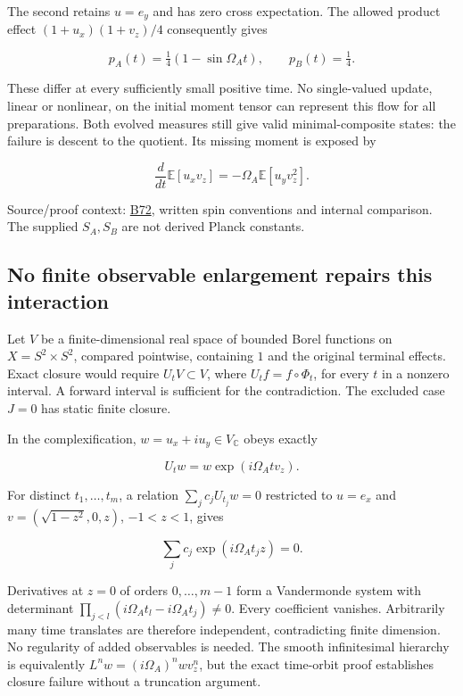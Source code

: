 \documentclass[11pt,a4paper]{article}
\begin{document}
The second retains \(u=e_y\) and has zero cross expectation. The allowed
product effect \((1+u_x)(1+v_z)/4\) consequently gives

\[p_A(t)=\tfrac14(1-\sin\Omega_At),\qquad p_B(t)=\tfrac14.\]

These differ at every sufficiently small positive time. No single-valued
update, linear or nonlinear, on the initial moment tensor can represent
this flow for all preparations. Both evolved measures still give valid
minimal-composite states: the failure is descent to the quotient. Its
missing moment is exposed by

\[\frac d{dt}\mathbb E[u_xv_z]=-\Omega_A\mathbb E[u_yv_z^2].\]

Source/proof context: \href{../references/batches/B72.md}{B72}, written
spin conventions and internal comparison. The supplied \(S_A,S_B\) are
not derived Planck constants.

\hypertarget{no-finite-observable-enlargement-repairs-this-interaction}{%
\subsection{No finite observable enlargement repairs this
interaction}\label{no-finite-observable-enlargement-repairs-this-interaction}}

Let \(V\) be a finite-dimensional real space of bounded Borel functions
on \(X=S^2\times S^2\), compared pointwise, containing \(1\) and the
original terminal effects. Exact closure would require
\(U_tV\subset V\), where \(U_tf=f\circ\Phi_t\), for every \(t\) in a
nonzero interval. A forward interval is sufficient for the
contradiction. The excluded case \(J=0\) has static finite closure.

In the complexification, \(w=u_x+iu_y\in V_{\mathbb C}\) obeys exactly

\[U_tw=w\exp(i\Omega_Atv_z).\]

For distinct \(t_1,\ldots,t_m\), a relation \(\sum_j c_jU_{t_j}w=0\)
restricted to \(u=e_x\) and \(v=(\sqrt{1-z^2},0,z)\), \(-1<z<1\), gives

\[\sum_jc_j\exp(i\Omega_At_jz)=0.\]

Derivatives at \(z=0\) of orders \(0,\ldots,m-1\) form a Vandermonde
system with determinant \(\prod_{j<l}(i\Omega_At_l-i\Omega_At_j)\ne0\).
Every coefficient vanishes. Arbitrarily many time translates are
therefore independent, contradicting finite dimension. No regularity of
added observables is needed. The smooth infinitesimal hierarchy is
equivalently \(L^nw=(i\Omega_A)^nwv_z^n\), but the exact time-orbit
proof establishes closure failure without a truncation argument.
\end{document}
